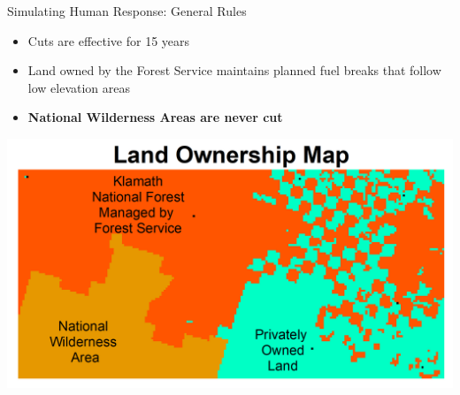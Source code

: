 \documentclass[xcolor=dvipsnames]{beamer}
\begin{document}
\begin{frame}{Simulating Human Response: General Rules}
\begin{itemize}
\item   Cuts are effective for 15 years
\item   Land owned by the Forest Service maintains planned fuel breaks that follow low elevation areas
\item   \textbf{National Wilderness Areas are never cut}
\end{itemize}
\vspace*{.25cm}
\centering\includegraphics[width=.75\linewidth]{landOwnershipMap.png}



\end{frame}
\end{document}
